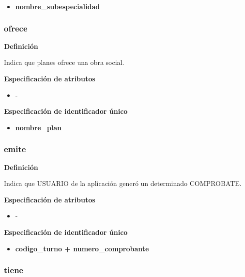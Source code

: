 \documentclass[a4paper,11pt]{article}
\begin{document}
\begin{itemize}

     \item \textbf{nombre\_subespecialidad}

\end{itemize}


\subsubsection{\textbf{ofrece}}

\textbf{Definición}

Indica que planes ofrece una obra social.

\textbf{Especificación de atributos}

\begin{itemize}
\item -
\end{itemize}

\textbf{Especificación de identificador único}

\begin{itemize}

    \item \textbf{nombre\_plan}

\end{itemize}


\subsubsection{\textbf{emite}}

\textbf{Definición}

Indica que USUARIO de la aplicación generó un determinado COMPROBATE.

\textbf{Especificación de atributos}

\begin{itemize}
\item -
\end{itemize}

\textbf{Especificación de identificador único}

\begin{itemize}

     \item \textbf{codigo\_turno + numero\_comprobante}

\end{itemize}

\subsubsection{\textbf{tiene}}
\end{document}
